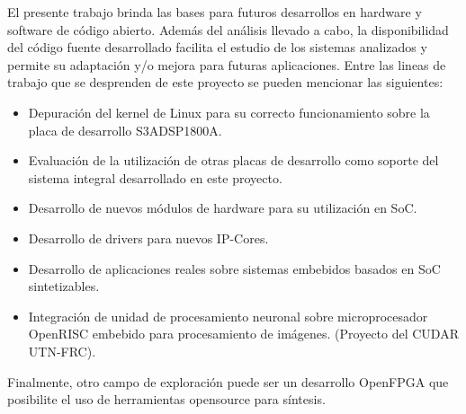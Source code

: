 El presente trabajo brinda las bases para futuros desarrollos en hardware y software de código abierto. Además del análisis llevado a cabo, la
disponibilidad del código fuente desarrollado facilita el estudio de los sistemas analizados y permite su adaptación y/o mejora para futuras
aplicaciones. Entre las lineas de trabajo que se desprenden de este proyecto se pueden mencionar las siguientes:

\begin {itemize}
\item Depuración del kernel de Linux para su correcto funcionamiento sobre la placa de desarrollo S3ADSP1800A.
\item Evaluación de la utilización de otras placas de desarrollo como soporte del sistema integral desarrollado en este proyecto.
\item Desarrollo de nuevos módulos de hardware para su utilización en SoC.
\item Desarrollo de drivers para nuevos IP-Cores.
\item Desarrollo de aplicaciones reales sobre sistemas embebidos basados en SoC sintetizables. 
\item Integración de unidad de procesamiento neuronal sobre microprocesador OpenRISC embebido para procesamiento de imágenes. (Proyecto del CUDAR
UTN-FRC).
\end{itemize}

Finalmente, otro campo de exploración puede ser un desarrollo OpenFPGA que posibilite el uso de herramientas opensource para síntesis.


